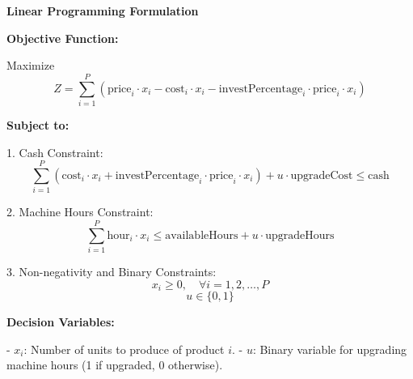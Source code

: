\documentclass{article}
\begin{document}
\textbf{Linear Programming Formulation}

\textbf{Objective Function:}

Maximize
\[
Z = \sum_{i=1}^{P} \left( \text{price}_i \cdot x_i - \text{cost}_i \cdot x_i - \text{investPercentage}_i \cdot \text{price}_i \cdot x_i \right)
\]

\textbf{Subject to:}

1. Cash Constraint:
\[
\sum_{i=1}^{P} \left( \text{cost}_i \cdot x_i + \text{investPercentage}_i \cdot \text{price}_i \cdot x_i \right) + u \cdot \text{upgradeCost} \leq \text{cash}
\]

2. Machine Hours Constraint:
\[
\sum_{i=1}^{P} \text{hour}_i \cdot x_i \leq \text{availableHours} + u \cdot \text{upgradeHours}
\]

3. Non-negativity and Binary Constraints:
\[
x_i \geq 0, \quad \forall i = 1, 2, \ldots, P
\]
\[
u \in \{0, 1\}
\]

\textbf{Decision Variables:}

- \( x_i \): Number of units to produce of product \( i \).
- \( u \): Binary variable for upgrading machine hours (1 if upgraded, 0 otherwise).
\end{document}
